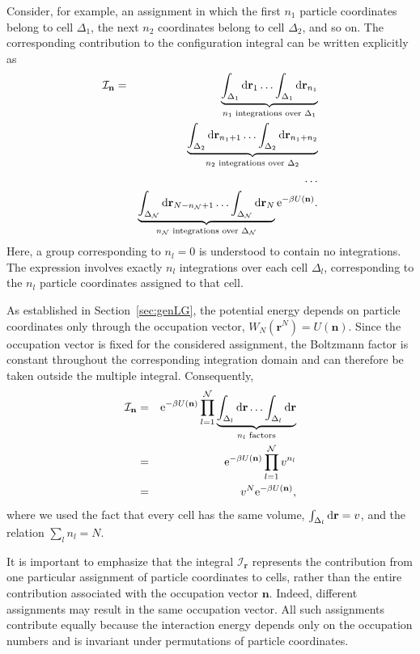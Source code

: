 \documentclass[12pt]{article}
\begin{document}
	Consider, for example, an assignment in which the first $n_1$ particle coordinates belong to cell $\Delta_1$, the next $n_2$ coordinates belong to cell $\Delta_2$, and so on. The corresponding contribution to the configuration integral can be written explicitly as
	\begin{eqnarray}
		\mathcal{I}_{\mathbf{n}} & = & \underbrace{\int_{\Delta_1} {\rm d} {\mathbf{r}_1} \ldots \int_{\Delta_1} {\rm d} {\mathbf{r}_{n_1}} }_{n_1 \text{ integrations over } \Delta_1}
		\nonumber\\
		& & \underbrace{\int_{\Delta_2} {\rm d} {\mathbf{r}_{n_1 + 1}} \ldots \int_{\Delta_2} {\rm d} {\mathbf{r}_{n_1 + n_2}} }_{n_2 \text{ integrations over } \Delta_2}
		\nonumber \\
		& & \ldots
		\nonumber\\
		& & \underbrace{\int_{\Delta_{\mathcal{N}}} {\rm d} {\mathbf{r}_{N - n_{\mathcal{N}} + 1}} \ldots \int_{\Delta_{\mathcal{N}}} {\rm d} {\mathbf{r}_{N}} }_{n_{\mathcal{N}} \text{ integrations over } \Delta_{\mathcal{N}}} {\rm e}^{-\beta U(\mathbf{n})}.
	\end{eqnarray}
	Here, a group corresponding to $n_l = 0$ is understood to contain no integrations. The expression involves exactly $n_l$ integrations over each cell $\Delta_l$, corresponding to the $n_l$ particle coordinates assigned to that cell.
	
	As established in Section~\ref{sec:genLG}, the potential energy depends on particle coordinates only through the occupation vector, $W_N(\mathbf{r}^N) = U(\mathbf{n})$. Since the occupation vector is fixed for the considered assignment, the Boltzmann factor is constant throughout the corresponding integration domain and can therefore be taken outside the multiple integral. Consequently,
	\begin{eqnarray}
		\mathcal{I}_{\mathbf{n}} & = & {\rm e}^{-\beta U(\mathbf{n})} \prod\limits_{l=1}^{\mathcal{N}} \underbrace{\int_{\Delta_l} {\rm d} {\mathbf{r}} \ldots \int_{\Delta_l} {\rm d} {\mathbf{r}} }_{n_l \text{ factors}}
		\nonumber\\
		& = & {\rm e}^{-\beta U(\mathbf{n})} \prod\limits_{l=1}^{\mathcal{N}} v^{n_l}
		\nonumber\\
		& = & v^N {\rm e}^{-\beta U(\mathbf{n})},
	\end{eqnarray}
	where we used the fact that every cell has the same volume, $\int_{\Delta_l} {\rm d} {\mathbf{r}} = v$, and the relation $\sum_l n_l = N$.
	
	It is important to emphasize that the integral $\mathcal{I}_{\mathbf{r}}$ represents the contribution from one particular assignment of particle coordinates to cells, rather than the entire contribution associated with the occupation vector $\mathbf{n}$. Indeed, different assignments may result in the same occupation vector. All such assignments contribute equally because the interaction energy depends only on the occupation numbers and is invariant under permutations of particle coordinates.
	
\end{document}
